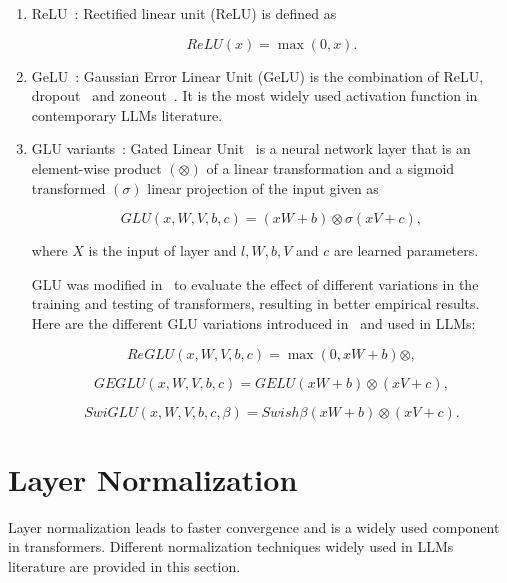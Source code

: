 \documentclass[a4paper,oneside]{book}
\begin{document}
\begin{enumerate}
    \item ReLU~\cite{nair2010rectified}: Rectified linear unit (ReLU) is defined as

    \begin{equation}
        ReLU(x)=\max(0, x).
    \end{equation}

    \item GeLU~\cite{hendrycks2016gaussian}: Gaussian Error Linear Unit (GeLU) is the combination of ReLU, dropout~\cite{srivastava2014dropout} and zoneout~\cite{krueger2016zoneout}. It is the most widely used activation function in contemporary LLMs literature.

    \item GLU variants~\cite{shazeer2020glu}: Gated Linear Unit~\cite{dauphin2017language} is a neural network layer that is an element-wise product $(\otimes)$ of a linear transformation and a sigmoid transformed $(\sigma)$ linear projection of the input given as

    \begin{equation}
        GLU(x, W, V, b, c)=(xW + b) \otimes \sigma(xV + c),
    \end{equation}

    where $X$ is the input of layer and $l, W, b, V$ and $c$ are learned parameters.

    GLU was modified in~\cite{shazeer2020glu} to evaluate the effect of different variations in the training and testing of transformers, resulting in better empirical results. Here are the different GLU variations introduced in~\cite{shazeer2020glu} and used in LLMs:

    \begin{equation}
        ReGLU(x, W, V, b, c) = \max (0, xW + b) \otimes,
    \end{equation}

    \begin{equation}
        GEGLU(x, W, V, b, c) = GELU(xW + b) \otimes(xV + c),
    \end{equation}

    \begin{equation}
        SwiGLU(x, W, V, b, c, \beta) = Swish \beta(xW + b) \otimes(xV + c).
    \end{equation}
\end{enumerate}

\section{Layer Normalization}
Layer normalization leads to faster convergence and is a widely used component in transformers. Different normalization techniques widely used in LLMs literature are provided in this section.
\end{document}

